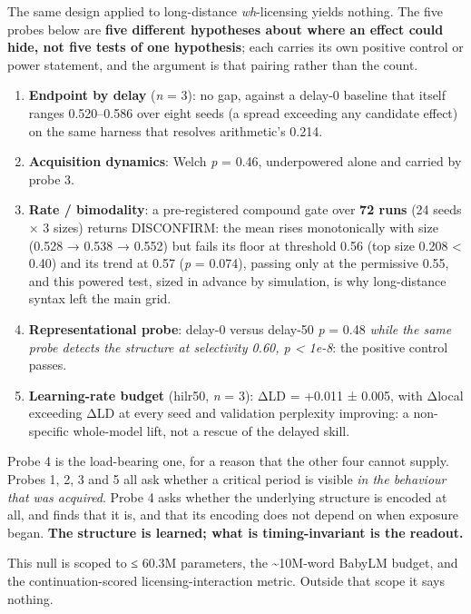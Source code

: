 \documentclass[11pt]{article}
\providecommand{\tightlist}{\setlength{\itemsep}{0pt}\setlength{\parskip}{0pt}}
\begin{document}
The same design applied to long-distance \emph{wh}-licensing yields nothing. The five probes
below are \textbf{five different hypotheses about where an effect could hide, not five tests of
one hypothesis}; each carries its own positive control or power statement, and the argument
is that pairing rather than the count.

\begin{enumerate}
\def\labelenumi{\arabic{enumi}.}
\tightlist
\item
  \textbf{Endpoint by delay} (\emph{n} = 3): no gap, against a delay-0 baseline that itself ranges
  0.520--0.586 over eight seeds (a spread exceeding any candidate effect) on the same
  harness that resolves arithmetic's 0.214.
\item
  \textbf{Acquisition dynamics}: Welch \emph{p} = 0.46, underpowered alone and carried by probe 3.
\item
  \textbf{Rate / bimodality}: a pre-registered compound gate over \textbf{72 runs} (24 seeds × 3
  sizes) returns DISCONFIRM: the mean rises monotonically with size (0.528 → 0.538 →
  0.552) but fails its floor at threshold 0.56 (top size 0.208 \textless{} 0.40) and its trend at
  0.57 (\emph{p} = 0.074), passing only at the permissive 0.55, and this powered test, sized in
  advance by simulation, is why long-distance syntax left the main grid.
\item
  \textbf{Representational probe}: delay-0 versus delay-50 \emph{p} = 0.48 \emph{while the same probe
  detects the structure at selectivity 0.60, p \textless{} 1e-8}: the positive control passes.
\item
  \textbf{Learning-rate budget} (hilr50, \emph{n} = 3): ΔLD = +0.011 ± 0.005, with Δlocal exceeding
  ΔLD at every seed and validation perplexity improving: a non-specific whole-model lift,
  not a rescue of the delayed skill.
\end{enumerate}

Probe 4 is the load-bearing one, for a reason that the other four cannot supply. Probes 1,
2, 3 and 5 all ask whether a critical period is visible \emph{in the behaviour that was
acquired}. Probe 4 asks whether the underlying structure is encoded at all, and finds that
it is, and that its encoding does not depend on when exposure began. \textbf{The structure is
learned; what is timing-invariant is the readout.}

This null is scoped to ≤ 60.3M parameters, the \textasciitilde10M-word BabyLM budget, and the
continuation-scored licensing-interaction metric. Outside that scope it says nothing.
\end{document}
